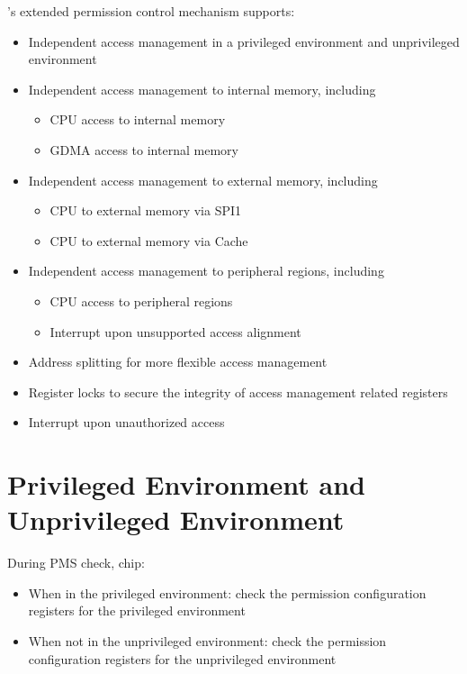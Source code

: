\documentclass[main\_\_EN.tex]{subfiles}
\begin{document}
\chipname{}'s extended permission control mechanism supports:

\begin{itemize}
    \item Independent access management in a privileged environment and unprivileged environment
    \item Independent access management to internal memory, including
    \begin{itemize}
        \item CPU access to internal memory
        \item GDMA access to internal memory
    \end{itemize}
    \item Independent access management to external memory, including
    \begin{itemize}
        \item CPU to external memory via SPI1
        \item CPU to external memory via Cache
    \end{itemize}
    \item Independent access management to peripheral regions, including
    \begin{itemize}
        \item CPU access to peripheral regions
        \item Interrupt upon unsupported access alignment
    \end{itemize}
    \item Address splitting for more flexible access management
    \item Register locks to secure the integrity of access management related registers
    \item Interrupt upon unauthorized access
\end{itemize}




\section{Privileged Environment and Unprivileged Environment}

During PMS check, \chipname{} chip:
\begin{itemize}
    \item When in the privileged environment: check the permission configuration registers for the privileged environment
    \item When not in the unprivileged environment: check the permission configuration registers for the unprivileged environment
\end{itemize}
\end{document}

